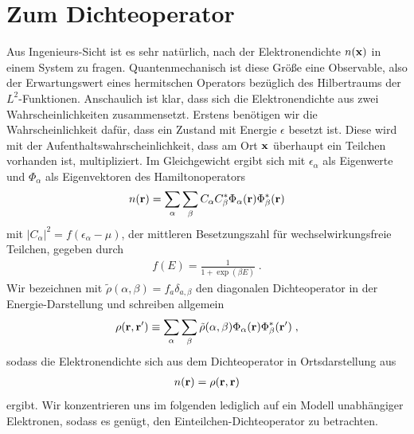 \section{Zum Dichteoperator}
Aus Ingenieurs-Sicht ist es sehr natürlich, nach der Elektronendichte $n(\vb{x})$ in einem System zu fragen. Quantenmechanisch ist diese Größe eine Observable, also der Erwartungswert eines hermitschen Operators bezüglich des Hilbertraums der $L^2$-Funktionen. Anschaulich ist klar, dass sich die Elektronendichte aus zwei Wahrscheinlichkeiten zusammensetzt. Erstens benötigen wir die Wahrscheinlichkeit dafür, dass ein Zustand mit Energie $\epsilon$ besetzt ist. Diese wird mit der  Aufenthaltswahrscheinlichkeit, dass am Ort $\vb{x}$ überhaupt ein Teilchen vorhanden ist, multipliziert. Im Gleichgewicht ergibt sich mit $\epsilon_{\alpha}$ als Eigenwerte und $\Phi_{\alpha}$ als Eigenvektoren des Hamiltonoperators \cite{datta}
\begin{align}
  n(\vb{r}) = \sum_{\alpha} \sum_{\beta} C_{\alpha} C_{\beta}^*\Phi_{\alpha}(\vb{r}) \Phi_{\beta}^*(\vb{r})
\end{align}
mit $|C_{\alpha}|^2 = f(\epsilon_{\alpha}-\mu)$, der mittleren Besetzungszahl für wechselwirkungsfreie Teilchen, gegeben durch
\begin{align}
  f(E) = \frac{1}{1+\exp(\beta E)} \; .
\end{align}
Wir bezeichnen mit $\tilde{\rho}(\alpha,\beta) = f_a\delta_{a,\beta}$ den diagonalen Dichteoperator in der Energie-Darstellung und schreiben allgemein
\begin{align}
  \rho(\vb{r},\vb{r}') \equiv \sum_{\alpha} \sum_{\beta} \tilde{\rho}(\alpha,\beta)\Phi_{\alpha}(\vb{r})\Phi^*_{\beta}(\vb{r}') \; ,
\end{align}
sodass die Elektronendichte sich aus dem Dichteoperator in Ortsdarstellung aus
\begin{align}
  n(\vb{r}) = \rho(\vb{r},\vb{r})
\end{align}
ergibt. Wir konzentrieren uns im folgenden lediglich auf ein Modell unabhängiger Elektronen, sodass es genügt, den Einteilchen-Dichteoperator zu betrachten.


